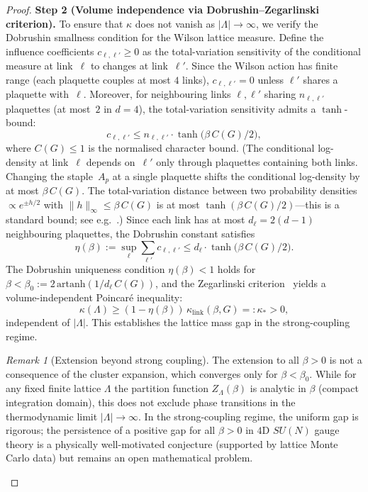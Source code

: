 \documentclass[12pt,a4paper]{article}
\theoremstyle{definition}
\theoremstyle{plain}
\theoremstyle{remark}
\newtheorem{remark}[definition]{Remark}
\begin{document}
\begin{proof}
\medskip
\noindent\textbf{Step 2 (Volume independence via Dobrushin--Zegarlinski criterion).}
To ensure that $\kappa$ does not vanish as $|\Lambda| \to \infty$, we verify the Dobrushin smallness condition for the Wilson lattice measure. Define the influence coefficients $c_{\ell,\ell'} \geq 0$ as the total-variation sensitivity of the conditional measure at link~$\ell$ to changes at link~$\ell'$. Since the Wilson action has finite range (each plaquette couples at most $4$ links), $c_{\ell,\ell'} = 0$ unless $\ell'$ shares a plaquette with~$\ell$. Moreover, for neighbouring links $\ell, \ell'$ sharing $n_{\ell,\ell'}$ plaquettes (at most~$2$ in $d=4$), the total-variation sensitivity admits a $\tanh$-bound:
\begin{equation}
    c_{\ell,\ell'} \leq n_{\ell,\ell'} \cdot \tanh\!\bigl(\beta\,C(G)/2\bigr),
\end{equation}
where $C(G) \leq 1$ is the normalised character bound. (The conditional log-density at link~$\ell$ depends on~$\ell'$ only through plaquettes containing both links. Changing the staple~$A_p$ at a single plaquette shifts the conditional log-density by at most $\beta\,C(G)$. The total-variation distance between two probability densities $\propto e^{\pm h/2}$ with $\|h\|_\infty \leq \beta\,C(G)$ is at most $\tanh(\beta\,C(G)/2)$---this is a standard bound; see e.g.\ \cite{DobrushinShlosman1985}.) Since each link has at most $d_\ell = 2(d-1)$ neighbouring plaquettes, the Dobrushin constant satisfies
\begin{equation}
    \eta(\beta) := \sup_\ell \sum_{\ell'} c_{\ell,\ell'} \leq d_\ell \cdot \tanh\!\bigl(\beta\,C(G)/2\bigr).
\end{equation}
The Dobrushin uniqueness condition $\eta(\beta) < 1$ holds for $\beta < \beta_0 := 2\,\mathrm{artanh}(1/d_\ell\,C(G))$, and the Zegarlinski criterion~\cite{Zegarlinski1990} yields a volume-independent Poincar\'e inequality:
\begin{equation}
    \kappa(\Lambda) \geq (1 - \eta(\beta))\,\kappa_{\mathrm{link}}(\beta, G) =: \kappa_* > 0,
\end{equation}
independent of $|\Lambda|$. This establishes the lattice mass gap in the strong-coupling regime.

\begin{remark}[Extension beyond strong coupling]\label{rem:all-beta}
The extension to all $\beta > 0$ is not a consequence of the cluster expansion, which converges only for $\beta < \beta_0$. While for any fixed finite lattice $\Lambda$ the partition function $Z_\Lambda(\beta)$ is analytic in $\beta$ (compact integration domain), this does not exclude phase transitions in the thermodynamic limit $|\Lambda| \to \infty$. In the strong-coupling regime, the uniform gap is rigorous; the persistence of a positive gap for all $\beta > 0$ in $4$D $SU(N)$ gauge theory is a physically well-motivated conjecture (supported by lattice Monte Carlo data) but remains an open mathematical problem.
\end{remark}


\end{proof}
\end{document}
